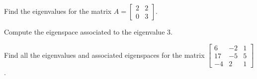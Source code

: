 \begin{applicationActivities}{3}{28}
\begin{activity}{0}
Find the eigenvalues for the matrix $A = \begin{bmatrix} 2 & 2 \\ 0 & 3 \end{bmatrix}$.
\end{activity}

\begin{activity}{0}
  Compute the eigenspace associated to the eigenvalue $3$.
\end{activity}

\begin{activity}{0}
  Find all the eigenvalues and associated eigenspaces for the matrix $\begin{bmatrix} 6 & -2 & 1 \\ 17 & -5 & 5 \\ -4 & 2 & 1 \end{bmatrix}$.
\end{activity}

\end{applicationActivities}
